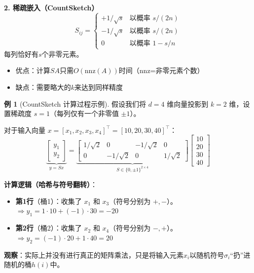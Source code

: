 \documentclass[11pt,a4paper]{ctexart}
\theoremstyle{definition}
\newtheorem{example}[theorem]{例}
\theoremstyle{remark}
\begin{document}
\textbf{2. 稀疏嵌入（CountSketch）}
\[
S_{ij} = \begin{cases}
+1/\sqrt{s} & \text{以概率 } s/(2n) \\
-1/\sqrt{s} & \text{以概率 } s/(2n) \\
0 & \text{以概率 } 1 - s/n
\end{cases}
\]
每列恰好有$s$个非零元素。
\begin{itemize}
    \item 优点：计算$SA$只需$O(\text{nnz}(A))$时间（$\text{nnz}$=非零元素个数）
    \item 缺点：需要略大的$k$来达到同样精度
\end{itemize}


\begin{example}[CountSketch 计算过程示例]
    假设我们将 $d=4$ 维向量投影到 $k=2$ 维，设置稀疏度 $s=1$（每列仅有一个非零值 $\pm 1$）。
    
    对于输入向量 $x = [x_1, x_2, x_3, x_4]^\top = [10, 20, 30, 40]^\top$：
    \[
    \underbrace{\begin{bmatrix}
    y_1 \\ y_2
    \end{bmatrix}}_{y = Sx}
    =
    \underbrace{\begin{bmatrix}
    1/\sqrt{2} & 0 & -1/\sqrt{2}  & 0 \\
    0 & -1/\sqrt{2}  & 0 & 1/\sqrt{2} 
    \end{bmatrix}}_{S \in \{0, \pm 1\}^{2 \times 4}}
    \begin{bmatrix}
    10 \\ 20 \\ 30 \\ 40
    \end{bmatrix}
    \]
    
    \textbf{计算逻辑（哈希与符号翻转）}：
    \begin{itemize}
        \item \textbf{第1行}（桶1）：收集了 $x_1$ 和 $x_3$（符号分别为 $+,-$）。\\
        $\Rightarrow y_1 = 1 \cdot 10 + (-1) \cdot 30 = -20$
        \item \textbf{第2行}（桶2）：收集了 $x_2$ 和 $x_4$（符号分别为 $-,+$）。\\
        $\Rightarrow y_2 = (-1) \cdot 20 + 1 \cdot 40 = 20$
    \end{itemize}
    
    \textbf{观察}：实际上并没有进行真正的矩阵乘法，只是将输入元素$x_i$以随机符号$\sigma_i$“扔”进随机的桶$h(i)$中。
\end{example}
\end{document}
